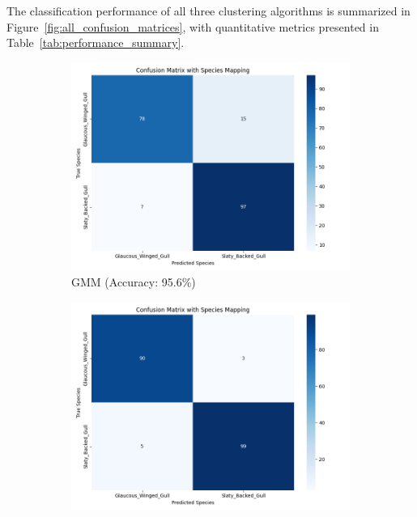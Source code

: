 \documentclass[a4paper,12pt]{report}
\begin{document}
The classification performance of all three clustering algorithms is summarized in Figure~\ref{fig:all_confusion_matrices}, with quantitative metrics presented in Table~\ref{tab:performance_summary}.

\begin{figure}[htbp]
    \centering
    \begin{subfigure}[b]{0.32\textwidth}
        \centering
        \includegraphics[width=\textwidth]{images/clustering/gmm_confusion_matrix.png}
        \caption{GMM (Accuracy: 95.6\%)}
        \label{fig:gmm_cm}
    \end{subfigure}
    \hfill
    \begin{subfigure}[b]{0.32\textwidth}
        \centering
        \includegraphics[width=\textwidth]{images/clustering/hierarchical_confusion_matrix.png}

\end{subfigure}
\end{figure}
\end{document}
